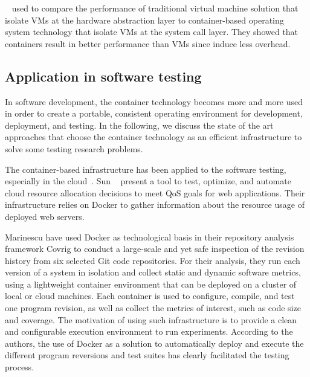 ~\cite{spoiala2016performance,soltesz2007container,merkel2014docker,felter2015updated} used to compare the performance of traditional virtual machine solution that isolate VMs at the hardware abstraction layer to container-based operating system technology that isolate VMs at the system call layer. They showed that containers result in better performance than VMs since  induce less overhead. 


\subsection{Application in software testing}  
In software development, the container technology becomes more and more used in order to create a portable, consistent operating environment for development, deployment, and testing.
In the following, we discuss the state of the art approaches that choose the container technology as an efficient infrastructure to solve some testing research problems. 

The container-based infrastructure has been applied to the software testing, especially in the cloud~\cite{li2015rest}. Sun \etal~\cite{sun2016roar} present a tool to test, optimize, and automate cloud resource allocation decisions to meet QoS goals for web applications. Their infrastructure relies on Docker to gather information about the resource usage of deployed web servers. 

Marinescu \etal\cite{marinescu2014covrig} have used Docker as technological basis in their repository analysis framework Covrig to conduct a large-scale and yet safe inspection of the revision history from six selected Git code repositories. 
For their analysis, they run each version of a system in isolation and collect static and dynamic software metrics, using a lightweight container environment that can be deployed on a cluster of local or cloud machines. Each container is used to configure, compile, and test one program revision, as well as collect the metrics of interest, such as code size and coverage.
The motivation of using such infrastructure is to provide a clean and configurable execution environment to run experiments. According to the authors, the use of Docker as a solution to automatically deploy and execute the different program reversions and test suites has clearly facilitated the testing process.


